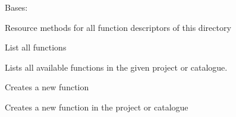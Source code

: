 \documentclass[letterpaper,10pt,english]{sphinxmanual}
\begin{document}
\begin{fulllineitems}
\label{_source/son_editor.apis:son_editor.apis.project_functionsapi.Functions}
Bases: 

Resource methods for all function descriptors of this directory

\begin{fulllineitems}
\label{_source/son_editor.apis:son_editor.apis.project_functionsapi.Functions.get}
List all functions

Lists all available functions in the given project or catalogue.

\end{fulllineitems}


\begin{fulllineitems}
\label{_source/son_editor.apis:son_editor.apis.project_functionsapi.Functions.methods}
\end{fulllineitems}


\begin{fulllineitems}
\label{_source/son_editor.apis:son_editor.apis.project_functionsapi.Functions.post}
Creates a new function

Creates a new function in the project or catalogue

\end{fulllineitems}


\end{fulllineitems}

\end{document}
